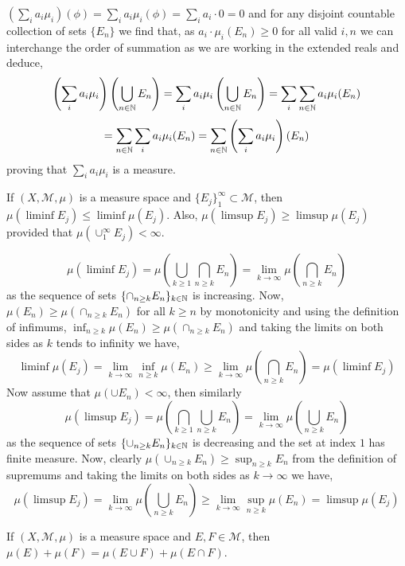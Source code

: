 \documentclass[12pt,a4paper]{article}
\begin{document}
\begin{solution}
    $\left(\sum_i a_i\mu_i\right)(\phi)=\sum_i a_i\mu_i(\phi)=\sum_i a_i\cdot 0=0$ and for any disjoint countable collection of sets $\{E_n\}$ we find that, as $a_i\cdot\mu_i(E_n)\geq 0$ for all valid $i,n$ we can interchange the order of summation as we are working in the extended reals and deduce,
    $$\left(\sum_i a_i\mu_i\right)\left(\bigcup_{n\in\mathbb{N}}E_n\right)=\sum_i a_i\mu_i\left(\bigcup_{n\in\mathbb{N}}E_n\right)=\sum_i \sum_{n\in\mathbb{N}} a_i\mu_i(E_n)$$
    $$=\sum_{n\in\mathbb{N}}\sum_i a_i\mu_i(E_n)=\sum_{n\in\mathbb{N}}\left(\sum_i a_i\mu_i\right)(E_n)$$
    proving that $\sum_i a_i\mu_i$ is a measure.
\end{solution}
\begin{problem}\label{prob:1-8}
If $(X, \mathcal{M}, \mu)$ is a measure space and $\{E_j\}_{1}^{\infty} \subset \mathcal{M}$, then $\mu(\liminf E_j) \le \liminf \mu(E_j)$. Also, $\mu(\limsup E_j) \ge \limsup \mu(E_j)$ provided that $\mu(\cup_{1}^{\infty} E_j) < \infty$.
\end{problem}
\begin{solution}
    $$\mu(\liminf E_j)=\mu\left(\bigcup_{k\geq 1}\bigcap_{n\geq k}E_n\right)=\lim_{k\to\infty}\mu\left(\bigcap_{n\geq k}E_n\right)$$
    as the sequence of sets $\{\cap_{n\geq k}E_n\}_{k\in\mathbb{N}}$ is increasing. Now, $\mu(E_n)\geq\mu(\cap_{n\geq k}E_n)$ for all $k\geq n$ by monotonicity and using the definition of infimums, $\inf_{n\geq k}\mu(E_n)\geq\mu(\cap_{n\geq k}E_n)$ and taking the limits on both sides as $k$ tends to infinity we have,
    $$\liminf\mu(E_j)=\lim_{k\to\infty}\inf_{n\geq k}\mu(E_n)\geq\lim_{k\to\infty}\mu\left(\bigcap_{n\geq k}E_n\right)=\mu\left(\liminf E_j\right)$$
    Now assume that $\mu(\cup E_n)<\infty$, then similarly
    $$\mu(\limsup E_j)=\mu\left(\bigcap_{k\geq 1}\bigcup_{n\geq k}E_n\right)=\lim_{k\to\infty}\mu\left(\bigcup_{n\geq k}E_n\right)$$
    as the sequence of sets $\{\cup_{n\geq k}E_n\}_{k\in\mathbb{N}}$ is decreasing and the set at index $1$ has finite measure. 
    Now, clearly $\mu(\cup_{n\geq k}E_n)\geq\sup_{n\geq k}E_n$ from the definition of supremums and taking the limits on both sides as $k\to\infty$ we have,
    $$\mu(\limsup E_j)=\lim_{k\to\infty}\mu\left(\bigcup_{n\geq k}E_n\right)\geq\lim_{k\to\infty}\sup_{n\geq k}\mu(E_n)=\limsup\mu(E_j)$$
\end{solution}
\begin{problem}\label{prob:1-9}
If $(X, \mathcal{M}, \mu)$ is a measure space and $E, F \in \mathcal{M}$, then $\mu(E) + \mu(F) = \mu(E \cup F) + \mu(E \cap F)$.
\end{problem}
\end{document}
